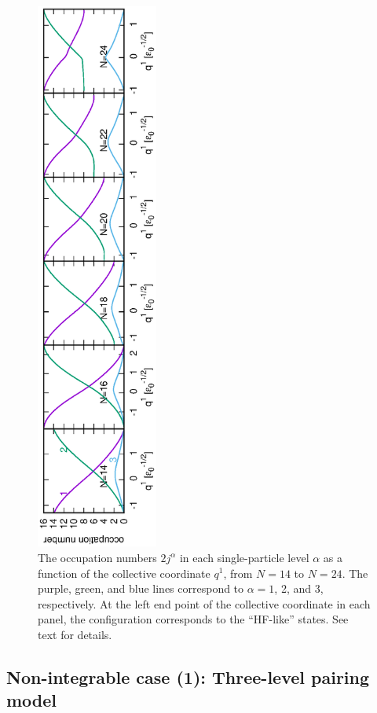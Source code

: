 \documentclass[%
superscriptaddress,
showpacs,
nofootinbib,
amsmath,amssymb,
aps,
prc,
twocolumn,
floatfix ]%
{revtex4-1}
\begin{document}
\begin{figure}[tb]
 \begin{center}
  \includegraphics[width=40mm,angle=-90]{occ_number.eps}
 \end{center}
\caption{The occupation numbers $2j^{\alpha}$ in each single-particle level $\alpha$
as a function of the collective coordinate $q^1$,
from $N=14$ to $N=24$.
The purple, green, and blue lines correspond to
$\alpha=1$, 2, and 3, respectively.
At the left end point of the collective coordinate in each panel,
the configuration corresponds to the ``HF-like'' states.
See text for details.
}
 \label{occ_number}
\end{figure}
\subsection{Non-integrable case (1): Three-level pairing model}
\label{sec:three-level-model}
\end{document}
